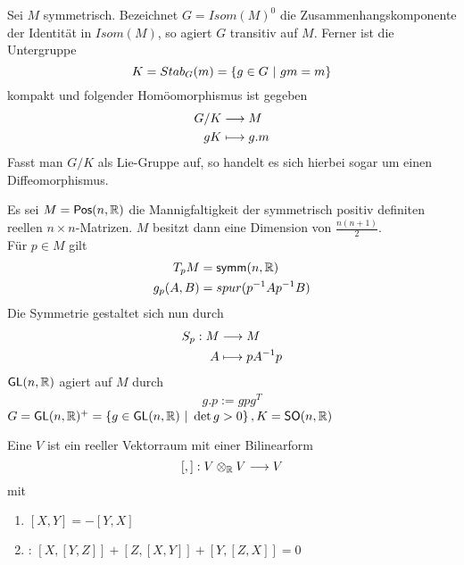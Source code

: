 \documentclass{book}
\newcommand{\GL}{\textsf{GL}(n,\R)}
\newcommand{\SO}{\textsf{SO}(n,\R)}
\newcommand{\POS}{\textsf{Pos}(n,\R)}
\newcommand{\symm}{\textsf{symm}(n,\R)}
\begin{document}
\Kor{}
Sei $M$ symmetrisch. Bezeichnet $G = Isom(M)^0$ die Zusammenhangskomponente der Identität in $Isom(M)$, so agiert $G$ transitiv auf $M$. Ferner ist die Untergruppe
\[ K = Stab_G(m) = \set{g \in G}{gm = m} \]
kompakt und folgender Homöomorphismus ist gegeben
\begin{align*}
G / K &\overset{}{\longrightarrow} M\\
gK &\longmapsto g.m
\end{align*}
Fasst man $G/K$ als Lie-Gruppe auf, so handelt es sich hierbei sogar um einen Diffeomorphismus.

\Bsp{}
Es sei $M = \POS$ die Mannigfaltigkeit der symmetrisch positiv definiten reellen $n\times n$-Matrizen. $M$ besitzt dann eine Dimension von $\frac{n(n+1)}{2}$.\\
Für $p \in M$ gilt
\begin{align*}
T_pM &= \symm\\
g_p(A,B) &=spur(p\i A p\i B)
\end{align*}
Die Symmetrie gestaltet sich nun durch
\begin{align*}
S_p : M &\overset{}{\longrightarrow} M\\
A &\longmapsto pA^{-1} p
\end{align*}
$\GL$ agiert auf $M$ durch
\begin{align*}
g.p := gpg^T
\end{align*}
$G = \GL^+ = \set{g \in \GL}{\det g > 0}, K = \SO$

\Def{}
Eine  $V$ ist ein reeller Vektorraum mit einer Bilinearform
\[ [,] : V\otimes_{\mathbb{R}} V \overset{}{\longrightarrow} V \]
mit
\begin{enumerate}[1.)]
\item $[X,Y] = -[Y,X]$
\item {}: $[X,[Y,Z]] + [Z,[X,Y]] + [Y,[Z,X]] = 0$
\end{enumerate}
\end{document}
